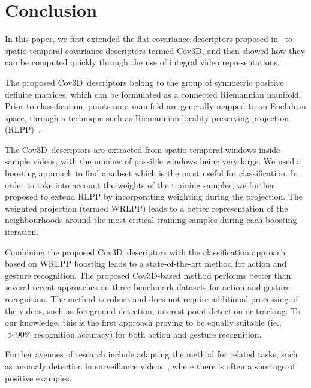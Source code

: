 \documentclass[10pt,twocolumn,letterpaper]{article}
\newcommand{\cov}{{Cov3D}}
\begin{document}
\section{Conclusion}
\label{sec:discussion}


In this paper, we first extended the flat covariance descriptors proposed in~\cite{TuzelEtAl2008}
to spatio-temporal covariance descriptors termed \cov,
and then showed how they can be computed quickly through the use of integral video representations. 

The proposed \cov~descriptors belong to the group of symmetric positive definite matrices,
which can be formulated as a connected Riemannian manifold.
Prior to classification, points on a manifold are generally mapped to an Euclidean space,
through a technique such as Riemannian locality preserving projection (RLPP)~\cite{HarandiEtAl2012}.

The \cov~descriptors are extracted from spatio-temporal windows inside sample videos,
with the number of possible windows being very large.
We used a boosting approach to find a subset which is the most useful for classification.
In order to take into account the weights of the training samples,
we further proposed to extend RLPP by incorporating weighting during the projection.
The weighted projection (termed WRLPP) leads to a better representation of the
neighbourhoods around the most critical training samples during each boosting iteration.

Combining the proposed \cov~descriptors with the classification approach based on WRLPP boosting
leads to a state-of-the-art method for action and gesture recognition.
The proposed \cov-based method performs better than several recent approaches 
on three benchmark datasets for action and gesture recognition.
The method is robust and does not require additional processing of the videos,
such as foreground detection, interest-point detection or tracking.
To our knowledge, this is the first approach proving to be equally suitable (ie., $>90\%$ recognition accuracy)
for both action and gesture recognition.


Further avenues of research include adapting the method for related tasks,
such as anomaly detection in surveillance videos~\cite{reddy_cvprw_2011},
where there is often a shortage of positive examples.




\balance
\renewcommand{\baselinestretch}{0.983}\small\footnotesize
\footnotesize


\end{document}
